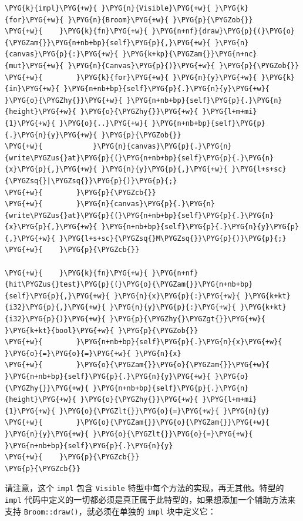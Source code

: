 \begin{Verbatim}[commandchars=\\\{\},breaklines=true,breakanywhere=true,fontsize=\codefont,xleftmargin=17bp]
\PYG{k}{impl}\PYG{+w}{ }\PYG{n}{Visible}\PYG{+w}{ }\PYG{k}{for}\PYG{+w}{ }\PYG{n}{Broom}\PYG{+w}{ }\PYG{p}{\PYGZob{}}
\PYG{+w}{    }\PYG{k}{fn}\PYG{+w}{ }\PYG{n+nf}{draw}\PYG{p}{(}\PYG{o}{\PYGZam{}}\PYG{n+nb+bp}{self}\PYG{p}{,}\PYG{+w}{ }\PYG{n}{canvas}\PYG{p}{:}\PYG{+w}{ }\PYG{k+kp}{\PYGZam{}}\PYG{n+nc}{mut}\PYG{+w}{ }\PYG{n}{Canvas}\PYG{p}{)}\PYG{+w}{ }\PYG{p}{\PYGZob{}}
\PYG{+w}{        }\PYG{k}{for}\PYG{+w}{ }\PYG{n}{y}\PYG{+w}{ }\PYG{k}{in}\PYG{+w}{ }\PYG{n+nb+bp}{self}\PYG{p}{.}\PYG{n}{y}\PYG{+w}{ }\PYG{o}{\PYGZhy{}}\PYG{+w}{ }\PYG{n+nb+bp}{self}\PYG{p}{.}\PYG{n}{height}\PYG{+w}{ }\PYG{o}{\PYGZhy{}}\PYG{+w}{ }\PYG{l+m+mi}{1}\PYG{+w}{ }\PYG{o}{..}\PYG{+w}{ }\PYG{n+nb+bp}{self}\PYG{p}{.}\PYG{n}{y}\PYG{+w}{ }\PYG{p}{\PYGZob{}}
\PYG{+w}{            }\PYG{n}{canvas}\PYG{p}{.}\PYG{n}{write\PYGZus{}at}\PYG{p}{(}\PYG{n+nb+bp}{self}\PYG{p}{.}\PYG{n}{x}\PYG{p}{,}\PYG{+w}{ }\PYG{n}{y}\PYG{p}{,}\PYG{+w}{ }\PYG{l+s+sc}{\PYGZsq{}|\PYGZsq{}}\PYG{p}{)}\PYG{p}{;}
\PYG{+w}{        }\PYG{p}{\PYGZcb{}}
\PYG{+w}{        }\PYG{n}{canvas}\PYG{p}{.}\PYG{n}{write\PYGZus{}at}\PYG{p}{(}\PYG{n+nb+bp}{self}\PYG{p}{.}\PYG{n}{x}\PYG{p}{,}\PYG{+w}{ }\PYG{n+nb+bp}{self}\PYG{p}{.}\PYG{n}{y}\PYG{p}{,}\PYG{+w}{ }\PYG{l+s+sc}{\PYGZsq{}M\PYGZsq{}}\PYG{p}{)}\PYG{p}{;}
\PYG{+w}{    }\PYG{p}{\PYGZcb{}}

\PYG{+w}{    }\PYG{k}{fn}\PYG{+w}{ }\PYG{n+nf}{hit\PYGZus{}test}\PYG{p}{(}\PYG{o}{\PYGZam{}}\PYG{n+nb+bp}{self}\PYG{p}{,}\PYG{+w}{ }\PYG{n}{x}\PYG{p}{:}\PYG{+w}{ }\PYG{k+kt}{i32}\PYG{p}{,}\PYG{+w}{ }\PYG{n}{y}\PYG{p}{:}\PYG{+w}{ }\PYG{k+kt}{i32}\PYG{p}{)}\PYG{+w}{ }\PYG{p}{\PYGZhy{}\PYGZgt{}}\PYG{+w}{ }\PYG{k+kt}{bool}\PYG{+w}{ }\PYG{p}{\PYGZob{}}
\PYG{+w}{        }\PYG{n+nb+bp}{self}\PYG{p}{.}\PYG{n}{x}\PYG{+w}{ }\PYG{o}{=}\PYG{o}{=}\PYG{+w}{ }\PYG{n}{x}
\PYG{+w}{        }\PYG{o}{\PYGZam{}}\PYG{o}{\PYGZam{}}\PYG{+w}{ }\PYG{n+nb+bp}{self}\PYG{p}{.}\PYG{n}{y}\PYG{+w}{ }\PYG{o}{\PYGZhy{}}\PYG{+w}{ }\PYG{n+nb+bp}{self}\PYG{p}{.}\PYG{n}{height}\PYG{+w}{ }\PYG{o}{\PYGZhy{}}\PYG{+w}{ }\PYG{l+m+mi}{1}\PYG{+w}{ }\PYG{o}{\PYGZlt{}}\PYG{o}{=}\PYG{+w}{ }\PYG{n}{y}
\PYG{+w}{        }\PYG{o}{\PYGZam{}}\PYG{o}{\PYGZam{}}\PYG{+w}{ }\PYG{n}{y}\PYG{+w}{ }\PYG{o}{\PYGZlt{}}\PYG{o}{=}\PYG{+w}{ }\PYG{n+nb+bp}{self}\PYG{p}{.}\PYG{n}{y}
\PYG{+w}{    }\PYG{p}{\PYGZcb{}}
\PYG{p}{\PYGZcb{}}
\end{Verbatim}

请注意，这个 \texttt{impl} 包含 \texttt{Visible} 特型中每个方法的实现，再无其他。特型的 \texttt{impl} 代码中定义的一切都必须是真正属于此特型的，如果想添加一个辅助方法来支持 \texttt{Broom::draw()}，就必须在单独的 \texttt{impl} 块中定义它：

